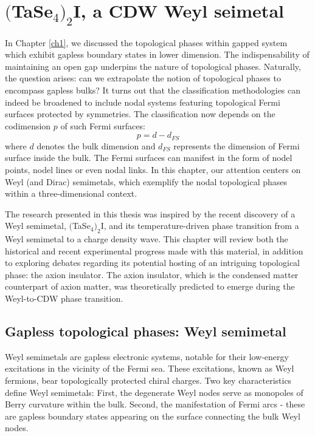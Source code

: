 \chapter{$($TaSe$_4)_2$I, a CDW Weyl seimetal}

In Chapter \ref{ch1}, we discussed the topological phases within gapped system which exhibit gapless boundary states in lower dimension. The indispensability of maintaining an open gap underpins the nature of topological phases.  Naturally, the question arises: can we extrapolate the notion of topological phases to encompass gapless bulks? It turns out that the classification methodologies can indeed be broadened to include nodal systems featuring topological Fermi surfaces protected by symmetries\cite{matsuura2013protected, chiu2014classification, armitage2018weyl, belopolski2019discovery,fang2016topological}. The classification now depends on the codimension $p$ of such Fermi surfaces:
\begin{equation}
    p=d-d_{FS}
\end{equation}
where $d$ denotes the bulk dimension and $d_{FS}$ represents the dimension of Fermi surface inside the bulk. The Fermi surfaces can manifest in the form of nodel points, nodel lines or even nodal links\cite{yan2017nodal}. In this chapter, our attention centers on Weyl (and Dirac) semimetals, which exemplify the nodal topological phases within a three-dimensional context.

The research presented in this thesis was inspired by the recent discovery of a Weyl semimetal, $($TaSe$_4)_2$I, and its temperature-driven phase transition from a Weyl semimetal to a charge density wave. This chapter will review both the historical and recent experimental progress made with this material, in addition to exploring debates regarding its potential hosting of an intriguing topological phase: the axion insulator. The axion insulator, which is the condensed matter counterpart of axion matter, was theoretically predicted to emerge during the Weyl-to-CDW phase transition.

\section{Gapless topological phases: Weyl semimetal}
\label{sec:weyl}
Weyl semimetals are gapless electronic systems, notable for their low-energy excitations in the vicinity of the Fermi sea. These excitations, known as Weyl fermions, bear topologically protected chiral charges. Two key characteristics define Weyl semimetals: First, the degenerate Weyl nodes serve as monopoles of Berry curvature within the bulk. Second, the manifestation of Fermi arcs - these are gapless boundary states appearing on the surface connecting the bulk Weyl nodes.

